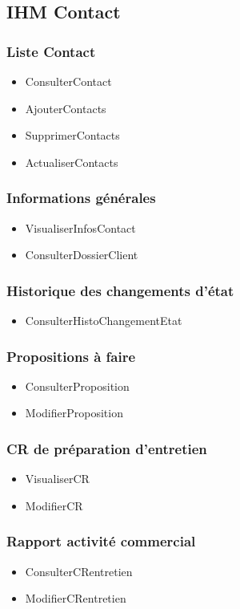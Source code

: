 \subsection{IHM Contact}

\subsubsection*{Liste Contact}
\begin{itemize}
\item ConsulterContact
\item AjouterContacts  
\item SupprimerContacts 
\item ActualiserContacts
\end{itemize}

\subsubsection*{Informations générales}
\begin{itemize}
\item VisualiserInfosContact
\item ConsulterDossierClient
\end{itemize}

\subsubsection*{Historique des changements d'état}
\begin{itemize}
\item ConsulterHistoChangementEtat
\end{itemize}

\subsubsection*{Propositions à faire}
\begin{itemize}
\item ConsulterProposition
\item ModifierProposition
\end{itemize}

\subsubsection*{CR de préparation d'entretien}
\begin{itemize}
\item VisualiserCR
\item ModifierCR
\end{itemize}

\subsubsection*{Rapport activité commercial}
\begin{itemize}
\item ConsulterCRentretien 
\item ModifierCRentretien
\end{itemize}